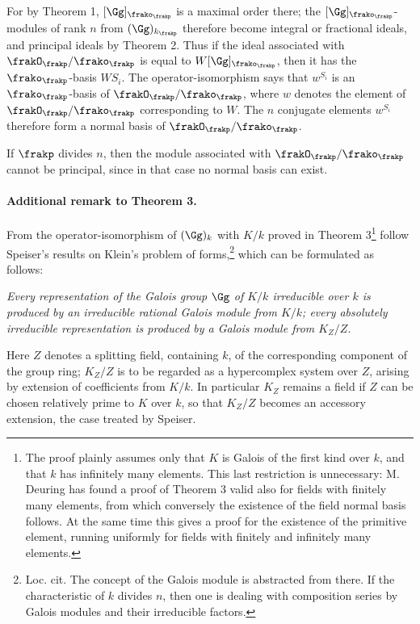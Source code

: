 For by Theorem 1, \([\Gg]_{\frako_\frakp}\) is a maximal order there; the \([\Gg]_{\frako_\frakp}\)-modules of rank \(n\) from \((\Gg)_{k_\frakp}\) therefore become integral or fractional ideals, and principal ideals by Theorem 2. Thus if the ideal associated with \(\frakO_\frakp/\frako_\frakp\) is equal to \(W[\Gg]_{\frako_\frakp}\), then it has the \(\frako_\frakp\)-basis \(WS_i\). The operator-isomorphism says that \(w^{S_i}\) is an \(\frako_\frakp\)-basis of \(\frakO_\frakp/\frako_\frakp\), where \(w\) denotes the element of \(\frakO_\frakp/\frako_\frakp\) corresponding to \(W\). The \(n\) conjugate elements \(w^{S_i}\) therefore form a normal basis of \(\frakO_\frakp/\frako_\frakp\).

If \(\frakp\) divides \(n\), then the module associated with \(\frakO_\frakp/\frako_\frakp\) cannot be principal, since in that case no normal basis can exist.

\paragraph{Additional remark to Theorem 3.}
From the operator-isomorphism of \((\Gg)_k\) with \(K/k\) proved in Theorem 3\footnote{The proof plainly assumes only that \(K\) is Galois of the first kind over \(k\), and that \(k\) has infinitely many elements. This last restriction is unnecessary: M. Deuring has found a proof of Theorem 3 valid also for fields with finitely many elements, from which conversely the existence of the field normal basis follows. At the same time this gives a proof for the existence of the primitive element, running uniformly for fields with finitely and infinitely many elements.} follow Speiser's results on Klein's problem of forms,\footnote{Loc. cit. The concept of the Galois module is abstracted from there. If the characteristic of \(k\) divides \(n\), then one is dealing with composition series by Galois modules and their irreducible factors.} which can be formulated as follows:

\emph{Every representation of the Galois group \(\Gg\) of \(K/k\) irreducible over \(k\) is produced by an irreducible rational Galois module from \(K/k\); every absolutely irreducible representation is produced by a Galois module from \(K_Z/Z\).}

Here \(Z\) denotes a splitting field, containing \(k\), of the corresponding component of the group ring; \(K_Z/Z\) is to be regarded as a hypercomplex system over \(Z\), arising by extension of coefficients from \(K/k\). In particular \(K_Z\) remains a field if \(Z\) can be chosen relatively prime to \(K\) over \(k\), so that \(K_Z/Z\) becomes an accessory extension, the case treated by Speiser.


